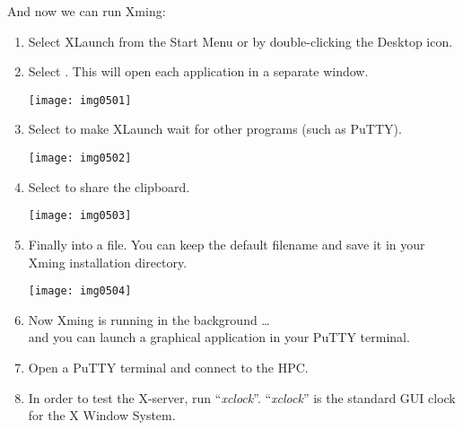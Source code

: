   And now we can run Xming:

  \begin{enumerate}
  \item Select XLaunch from the Start Menu or by double-clicking the Desktop icon.

  \item  Select . This will open each application in a separate window.

  \begin{center}
  \texttt{[image: img0501]}
  \end{center}

  \item  Select  to make XLaunch wait for other programs (such as PuTTY).

  \begin{center}
  \texttt{[image: img0502]}
  \end{center}


  \item  Select  to share the clipboard.

  \begin{center}
  \texttt{[image: img0503]}
  \end{center}


  \item  Finally  into a file. You can keep the default filename and save it in your Xming installation directory.

  \begin{center}
  \texttt{[image: img0504]}
  \end{center}

  \item  Now Xming is running in the background \ldots\\ and you can launch a graphical application in your PuTTY terminal.
  \item  Open a PuTTY terminal and connect  to the HPC.
  \item  In order to test the X-server, run ``\emph{xclock}''. ``\emph{xclock}'' is the standard GUI clock for the X Window System.
  \end{enumerate}

\begin{prompt}
\end{prompt}

